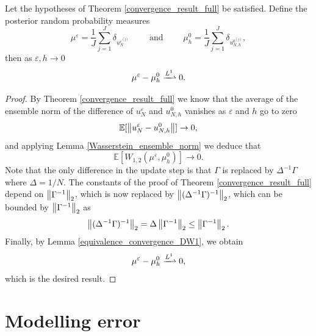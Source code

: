 \documentclass[10pt]{article}
\begin{document}
\begin{theorem}
\label{convergence_posterior_distributions}
Let the hypotheses of Theorem \ref{convergence_result_full} be satisfied. Define the posterior random probability measures
\[ \mu^{\varepsilon} = \frac{1}{J} \sum_{j=1}^J \delta_{u_N^{\varepsilon^{(j)}}} \qquad \text{ and } \qquad \mu_h^{0} = \frac{1}{J} \sum_{j=1}^J \delta_{u_{N,h}^{0^{(j)}}}, \]
then as $\varepsilon, h \to 0$
\[ \mu^{\varepsilon} - \mu_h^0 \xrightharpoonup{L^1} 0. \]
\end{theorem}
\begin{proof}
By Theorem \ref{convergence_result_full} we know that the average of the ensemble norm of the difference of $u_N^{\varepsilon}$ and $u_{N,h}^0$ vanishes as $\varepsilon$ and $h$ go to zero
\[ \mathbb{E} [ \left\|u_N^{\varepsilon} - u_{N,h}^0\right\| ] \to 0, \]
and applying Lemma \ref{Wasserstein_ensemble_norm} we deduce that
\[ \mathbb{E} [ W_{1,2}(\mu^{\varepsilon}, \mu_h^0) ] \to 0. \]
Note that the only difference in the update step is that $\Gamma$ is replaced by $\Delta^{-1} \Gamma$ where $\Delta = 1/N$. The constants of the proof of Theorem \ref{convergence_result_full} depend on $\left\|\Gamma^{-1}\right\|_2$, which is now replaced by $\left\|(\Delta^{-1} \Gamma)^{-1}\right\|_2$, which can be bounded by $\left\|\Gamma^{-1}\right\|_2$ as
\[ \left\|(\Delta^{-1} \Gamma)^{-1}\right\|_2 = \Delta \left\|\Gamma^{-1}\right\|_2 \le \left\|\Gamma^{-1}\right\|_2. \]
Finally, by Lemma \ref{equivalence_convergence_DW1}, we obtain
\[ \mu^{\varepsilon} - \mu_h^0 \xrightharpoonup{L^1} 0, \]
which is the desired result.
\end{proof}

\section{Modelling error}\label{Modelling}
\end{document}
